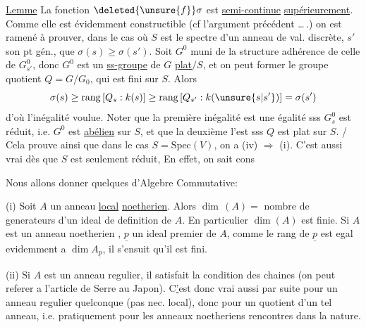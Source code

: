 \uline{Lemme}  La fonction $\deleted{\unsure{f}}\sigma$ est \uline{semi-continue} \uline{supérieurement}.
Comme elle est évidemment constructible (cf l'argument
précédent \ldots\,.) on est ramené à prouver, dans le cas où $S$ est
le spectre d'un anneau de val. discrète, $s'$ son pt gén.,
que $\sigma(s)\geq\sigma(s')$. Soit $G^0$ muni de la structure adhérence
de celle de $G^0_{s'}$, donc $G^0$ est un \uline{ss-groupe} de $G$ \uline{plat}$/S$,
et on peut former le groupe quotient $Q=G/G_0$, qui est
fini sur $S$. Alors
\[
\sigma(s)\geq\mathrm{rang}\,[Q_s:k(s)]\geq\mathrm{rang}\,[Q_{s'}:k(\unsure{s|s'})]=\sigma(s')
\]
d'où l'inégalité voulue. Noter que la première inégalité est
une égalité sss $G_s^0$ est réduit, i.e. $G^0$ est \uline{abélien} sur $S$, et
que la deuxième l'est sss $Q$ est plat sur $S$. / Cela prouve ainsi
que dans le cas $S=\mathrm{Spec}(V)$, on a (iv) $\Longrightarrow$ (i). C'est aussi
vrai dès que $S$ est seulement réduit, En effet, on sait cons%

Nous allons donner quelques  d'Algebre Commutative:

(i) Soit $A$ un anneau \uline{local} \uline{noetherien}. Alors $\dim\,(A)={}$ nombre 
de generateurs d'un ideal de definition de $A$. En particulier $\dim(A)$
est finie. Si $A$  est un anneau noetherien , $\underline p$ un ideal premier
de $A$, comme le rang de $\underline p$ est egal evidemment a $\dim A_{\underline p}$, il
s'ensuit qu'il est fini.

(ii) Si $A$ est un anneau  regulier, il satisfait la condition
des chaines (on peut referer a l'article de Serre au Japon). C\uline{'}est donc
vrai aussi par suite pour un anneau regulier quelconque (pas nec.
local), donc pour un quotient d'un tel anneau, i.e. pratiquement pour
 les anneaux noetheriens rencontres dans la nature.

